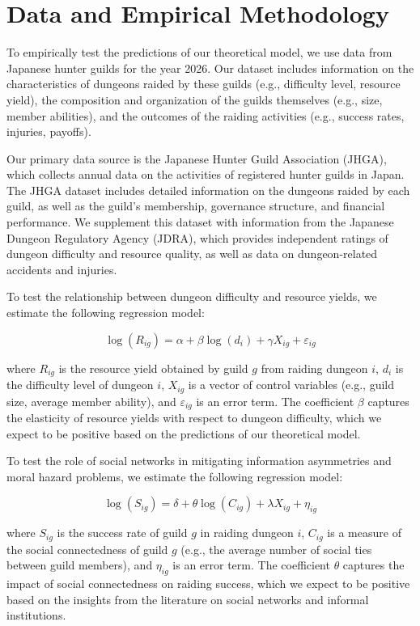 \documentclass[12pt, a4paper]{article}
\begin{document}
\section{Data and Empirical Methodology}
To empirically test the predictions of our theoretical model, we use data from Japanese hunter guilds for the year 2026. Our dataset includes information on the characteristics of dungeons raided by these guilds (e.g., difficulty level, resource yield), the composition and organization of the guilds themselves (e.g., size, member abilities), and the outcomes of the raiding activities (e.g., success rates, injuries, payoffs).

Our primary data source is the Japanese Hunter Guild Association (JHGA), which collects annual data on the activities of registered hunter guilds in Japan. The JHGA dataset includes detailed information on the dungeons raided by each guild, as well as the guild's membership, governance structure, and financial performance. We supplement this dataset with information from the Japanese Dungeon Regulatory Agency (JDRA), which provides independent ratings of dungeon difficulty and resource quality, as well as data on dungeon-related accidents and injuries.

To test the relationship between dungeon difficulty and resource yields, we estimate the following regression model:

\begin{equation}
\log(R_{ig}) = \alpha + \beta \log(d_i) + \gamma X_{ig} + \varepsilon_{ig}
\end{equation}

where $R_{ig}$ is the resource yield obtained by guild $g$ from raiding dungeon $i$, $d_i$ is the difficulty level of dungeon $i$, $X_{ig}$ is a vector of control variables (e.g., guild size, average member ability), and $\varepsilon_{ig}$ is an error term. The coefficient $\beta$ captures the elasticity of resource yields with respect to dungeon difficulty, which we expect to be positive based on the predictions of our theoretical model.

To test the role of social networks in mitigating information asymmetries and moral hazard problems, we estimate the following regression model:

\begin{equation}
\log(S_{ig}) = \delta + \theta \log(C_{ig}) + \lambda X_{ig} + \eta_{ig}
\end{equation}

where $S_{ig}$ is the success rate of guild $g$ in raiding dungeon $i$, $C_{ig}$ is a measure of the social connectedness of guild $g$ (e.g., the average number of social ties between guild members), and $\eta_{ig}$ is an error term. The coefficient $\theta$ captures the impact of social connectedness on raiding success, which we expect to be positive based on the insights from the literature on social networks and informal institutions.
\end{document}
